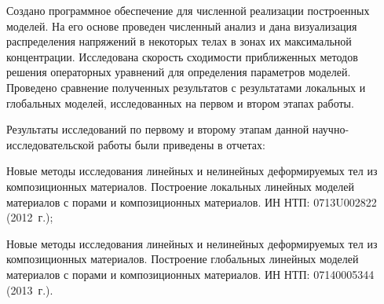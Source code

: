 Создано программное обеспечение для численной реализации построенных моделей. На его основе проведен численный анализ и дана визуализация распределения напряжений в некоторых телах в зонах их максимальной концентрации. Исследована скорость сходимости приближенных методов решения операторных уравнений для определения параметров моделей. Проведено сравнение полученных результатов с результатами локальных и глобальных моделей, исследованных на первом и втором этапах работы.

Результаты исследований по первому и второму этапам данной науч\-но-ис\-сле\-до\-ва\-тель\-ской работы были приведены в отчетах:

Новые методы исследования линейных и нелинейных деформируемых тел из композиционных материалов. Построение локальных линейных моделей материалов с порами и композиционных материалов. ИН НТП: 0713U002822 (2012~г.);

Новые методы исследования линейных и нелинейных деформируемых тел из композиционных материалов. Построение глобальных линейных моделей материалов с порами и композиционных материалов. ИН НТП: 07140005344 (2013~г.).
  


